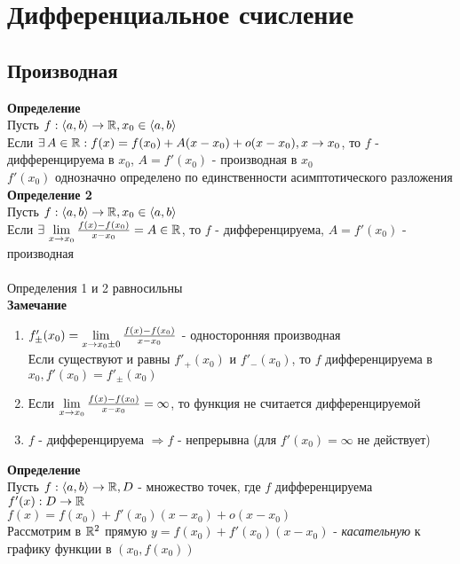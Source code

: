\documentclass[12pt]{article}
\begin{document}
\section{Дифференциальное счисление}
\subsection{Производная}
\textbf{Определение}\\
Пусть $f: \langle a, b\rangle \rightarrow \mathbb{R}, x_0 \in \langle a, b \rangle$\\
Если $\exists\, A \in \mathbb{R}: f(x) = f(x_0) + A(x-x_0)+o(x-x_0), x\rightarrow x_0$, то $f$ - дифференцируема в $x_0$, $A = f'(x_0)$ - производная в $x_0$\\
$f'(x_0)$ однозначно определено по единственности асимптотического разложения\\
\textbf{Определение 2}\\
Пусть $f: \langle a, b\rangle \rightarrow \mathbb{R}, x_0 \in \langle a, b \rangle$\\
Если $\exists\, \lim\limits_{x\rightarrow x_0} \frac{f(x)-f(x_0)}{x-x_0} = A \in \mathbb{R}$, то $f$ - дифференцируема, $A = f'(x_0)$ - производная\\\\
Определения 1 и 2 равносильны\\
\textbf{Замечание}
\begin{enumerate}
    \item $f'_\pm(x_0) = \lim\limits_{x\rightarrow x_0\pm0} \frac{f(x)-f(x_0)}{x-x_0}$ - односторонняя производная\\
    Если существуют и равны $f'_+(x_0)$ и $f'_-(x_0)$, то $f$ дифференцируема в $x_0, f'(x_0) = f'_\pm(x_0)$
    \item Если $\lim\limits_{x\rightarrow x_0} \frac{f(x)-f(x_0)}{x-x_0} = \infty$, то функция не считается дифференцируемой
    \item $f$ - дифференцируема $\Rightarrow f$ - непрерывна (для $f'(x_0) = \infty$ не действует)
\end{enumerate}
\textbf{Определение}\\
Пусть $f:\langle a, b \rangle \rightarrow \mathbb{R}, D$ - множество точек, где $f$ дифференцируема\\
$f'(x):D\rightarrow \mathbb{R}$\\
$f(x) = f(x_0) + f'(x_0)(x-x_0)+o(x-x_0)$\\
Рассмотрим в $\mathbb{R}^2$ прямую $y=f(x_0)+f'(x_0)(x-x_0)$ - \textit{касательную} к графику функции в $(x_0, f(x_0))$\\
\end{document}
